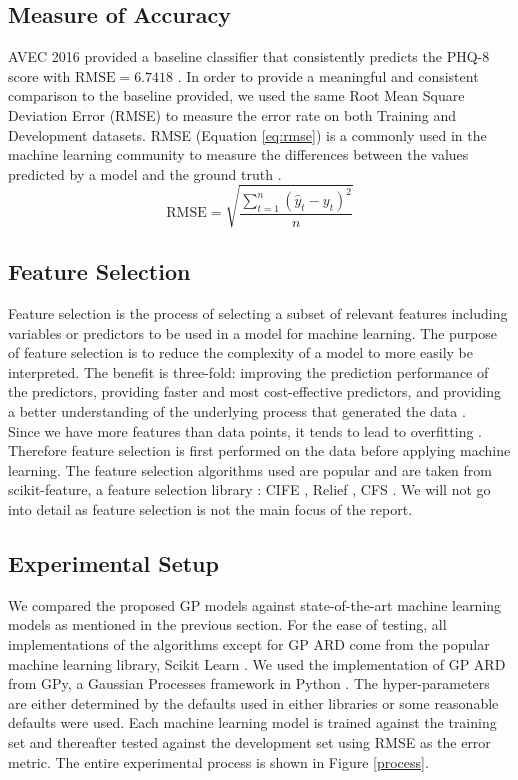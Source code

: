 \documentclass{article}
\begin{document}
 	\subsection{Measure of Accuracy}
	AVEC 2016 provided a baseline classifier that consistently predicts the PHQ-8 score with $\text{RMSE}=6.7418$ \cite{avec2016}. 
	In order to provide a meaningful and consistent comparison to the baseline provided, we used the same Root Mean Square Deviation Error (RMSE) to measure the 
	error rate on both Training and Development datasets. 
	RMSE (Equation \ref{eq:rmse}) is a commonly used in the machine learning community to measure the differences between the values predicted by a model 
	and the ground truth \cite{Dhanani:EECS-2014-131}. 
	\begin{equation}\label{eq:rmse}
  	\text{RMSE} = \sqrt{\frac{\sum_{t=1}^n (\hat y_t - y_t)^2}{n}}
 	\end{equation} 

	\subsection{Feature Selection}
	Feature selection is the process of selecting a subset of relevant features including variables or predictors to be used in a model for machine learning. 
	The purpose of feature selection is to reduce the complexity of a model to more easily be interpreted. 
	The benefit is three-fold: improving the prediction performance of the predictors, providing faster and most cost-effective predictors, 
	and providing a better understanding of the underlying process that generated the data \cite{Guyon2003}.\\
	
	Since we have more features than data points, it tends to lead to overfitting \cite{Smith2011}. 
	Therefore feature selection is first performed on the data before applying machine learning. 
	The feature selection algorithms used are popular and are taken from scikit-feature, a feature selection library \cite{li2016feature}: CIFE \cite{Lin2006}, Relief 	
	\cite{Rob2003}, CFS \cite{HALLHALL}. 
	We will not go into detail as feature selection is not the main focus of the report.
	
	\subsection{Experimental Setup}
	We compared the proposed GP models against state-of-the-art machine learning models as mentioned in the previous section. 
	For the ease of testing, all implementations of the algorithms except for GP ARD come from the popular machine learning library, Scikit Learn \cite{scikit-learn}. 
	We used the implementation of GP ARD from GPy, a Gaussian Processes framework in Python \cite{gpy2014}.
	The hyper-parameters are either determined by the defaults used in either libraries or some reasonable defaults were used.
	Each machine learning model is trained against the training set and thereafter tested against the development set using RMSE as the error metric. 
	The entire experimental process is shown in Figure \ref{process}. \\
 
\end{document}
